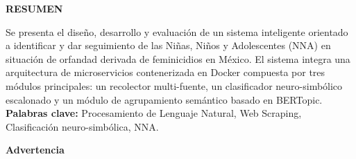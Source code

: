 \documentclass[12pt,openany,oneside]{book}
\begin{document}
\begin{center}
    \textbf{\large RESUMEN}
\end{center}
\noindent Se presenta el diseño, desarrollo y evaluación de un sistema inteligente orientado a identificar y dar seguimiento de las Niñas, Niños y Adolescentes (NNA) en situación de orfandad derivada de feminicidios en México. El sistema integra una arquitectura de microservicios contenerizada en Docker compuesta por tres módulos principales: un recolector multi-fuente, un clasificador neuro-simbólico escalonado y un módulo de agrupamiento semántico basado en BERTopic.\\[0.5cm]
\textbf{Palabras clave:} Procesamiento de Lenguaje Natural, Web Scraping, Clasificación neuro-simbólica, NNA.
\newpage

\newpage
\thispagestyle{empty}

\vspace*{\fill}

\begin{center}
    {\Large \textbf{Advertencia}}
\end{center}

\vspace{0.5cm}
\end{document}
